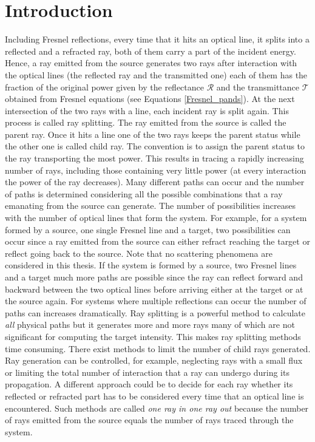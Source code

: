 \section{Introduction}
Including Fresnel reflections, every time that it hits an optical line, it splits into a reflected and a refracted ray, both of them carry a part of the incident energy.
Hence, a ray emitted from the source generates two rays after interaction with the optical lines (the reflected ray and the transmitted one) each of them has the fraction of the original power given by the reflectance $\mathcal{R}$ and the transmittance $\mathcal{T}$ obtained from Fresnel equations (see Equations \ref{Fresnel_pands}).
At the next intersection of the two rays with a line, each incident ray is split
again. This process is called ray splitting. The ray emitted from the source is called the parent ray. Once it hits a line one of the two rays keeps the parent status while the other one is called child ray. The convention is to assign the parent status to the ray transporting the most power.
This results in tracing a rapidly increasing number of rays, including those containing very little power (at every interaction the power of the ray decreases). 
Many different paths can occur and the number of paths is determined considering all the possible combinations that a ray emanating from the source can generate. The number of possibilities increases with the number of optical lines that form the system. For example, for a system formed by a source, one single Fresnel line and a target, two possibilities can occur since a ray emitted from the source can either refract reaching the target or reflect going back to the source. Note that no scattering phenomena are considered in this thesis. If the system is formed by a source, two Fresnel lines and a target much more paths are possible since the ray can reflect forward and backward between the two optical lines before arriving either at the target or at the source again. For systems where multiple reflections can occur the number of paths can increases dramatically. 
Ray splitting is a powerful method to calculate \textit{all} physical paths but it generates more and more rays many of which are not significant for computing the target intensity. This makes ray splitting methods time consuming. 
There exist methods to limit the number of child rays generated. Ray generation can be controlled, for example, neglecting rays with a small flux or limiting the total number of interaction that a ray can undergo during its propagation. A different approach could be to decide for each ray whether its reflected or refracted part has to be considered every time that an optical line is encountered. Such methods are called \textit{one ray in one ray out} because the number of rays emitted from the source equals the number of rays traced through the system.\\ \indent
